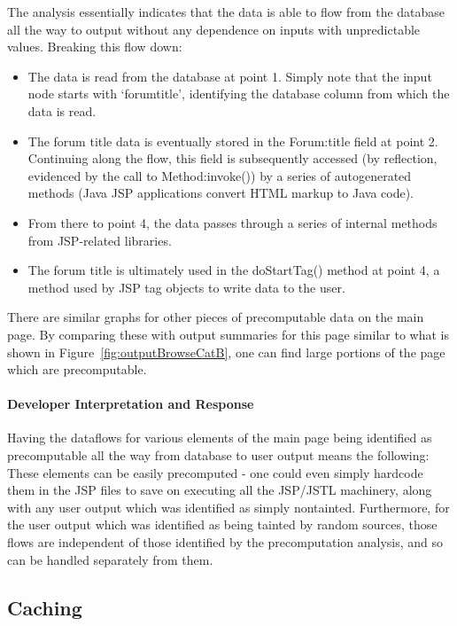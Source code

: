 \documentclass[msc,oneside]{ubcthesis}
\begin{document}
The analysis essentially indicates that the data is able to flow from the database all the way to output without any dependence on inputs with unpredictable values. Breaking this flow down:

\begin{itemize}
\item The data is read from the database at point 1. Simply note that the input node starts with `forumtitle', identifying the database column from which the data is read.
\item The forum title data is eventually stored in the Forum:title field at point 2. Continuing along the flow, this field is subsequently accessed (by reflection, evidenced by the call to Method:invoke()) by a series of autogenerated methods (Java JSP applications convert HTML markup to Java code). 
\item From there to point 4, the data passes through a series of internal methods from JSP-related libraries.
\item The forum title is ultimately used in the doStartTag() method at point 4, a method used by JSP tag objects to write data to the user.
\end{itemize}

There are similar graphs for other pieces of precomputable data on the main page. By comparing these with output summaries for this page similar to what is shown in Figure~\ref{fig:outputBrowseCatB}, one can find large portions of the page which are precomputable.
 
\paragraph{Developer Interpretation and Response}
Having the dataflows for various elements of the main page being identified as precomputable all the way from database to user output means the following: These elements can be easily precomputed - one could even simply hardcode them in the JSP files to save on executing all the JSP/JSTL machinery, along with any user output which was identified as simply nontainted. Furthermore, for the user output which was identified as being tainted by random sources, those flows are independent of those identified by the precomputation analysis, and so can be handled separately from them.

\subsection{Caching}
\label{ana:caching}
\end{document}

